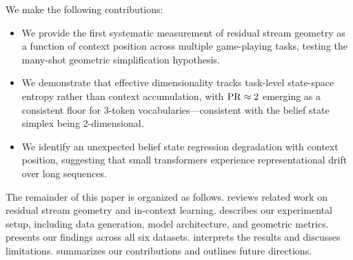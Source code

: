  We make the following contributions:
\begin{itemize}[leftmargin=*,itemsep=0pt,topsep=0pt]
    \item We provide the first systematic measurement of residual stream geometry as a function of context position across multiple game-playing tasks, testing the many-shot geometric simplification hypothesis.
    \item We demonstrate that effective dimensionality tracks task-level state-space entropy rather than context accumulation, with $\mathrm{PR} \approx 2$ emerging as a consistent floor for 3-token vocabularies---consistent with the belief state simplex being 2-dimensional.
    \item We identify an unexpected belief state regression degradation with context position, suggesting that small transformers experience representational drift over long sequences.
\end{itemize}

The remainder of this paper is organized as follows.  reviews related work on residual stream geometry and in-context learning.  describes our experimental setup, including data generation, model architecture, and geometric metrics.  presents our findings across all six datasets.  interprets the results and discusses limitations.  summarizes our contributions and outlines future directions.
